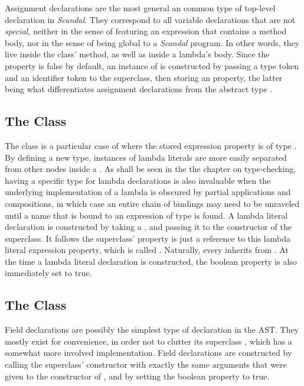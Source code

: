 Assignment declarations are the most general an common type of top-level declaration in \emph{Scandal}. They correspond to all variable declarations that are not \emph{special}, neither in the sense of featuring an expression that contains a method body, nor in the sense of being global to a \emph{Scandal} program. In other words, they live inside the  class'  method, as well as inside a lambda's body. Since the  property is false by default, an instance of  is constructed by passing a type token and an identifier token to the superclass, then storing an  property, the latter being what differentiates assignment declarations from the abstract type .

\subsection{The  Class}

The  class is a particular case of  where the stored expression property is of type . By defining a new type, instances of lambda literals are more easily separated from other nodes inside a . As shall be seen in the the chapter on type-checking, having a specific type for lambda declarations is also invaluable when the underlying implementation of a lambda is obscured by partial applications and compositions, in which case an entire chain of bindings may need to be unraveled until a name that is bound to an expression of type  is found. A lambda literal declaration is constructed by taking a , and passing it to the constructor of the superclass. It follows the superclass'  property is just a reference to this lambda literal expression property, which is called . Naturally, every  inherits from . At the time a lambda literal declaration is constructed, the  boolean property is also immediately set to true.

\subsection{The  Class}

Field declarations are possibly the simplest type of declaration in the AST. They mostly exist for convenience, in order not to clutter its superclass , which has a somewhat more involved implementation. Field declarations are constructed by calling the superclass' constructor with exactly the same arguments that were given to the constructor of , and by setting the  boolean property to true.

